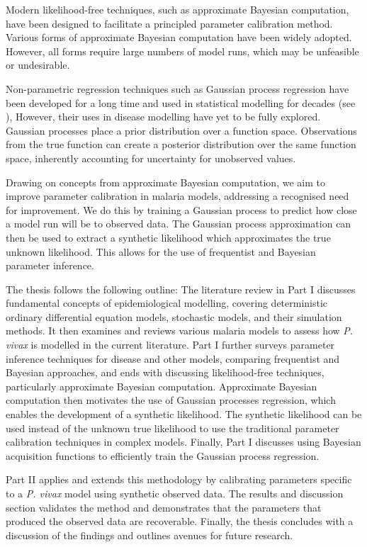 Modern
likelihood-free techniques, such as approximate Bayesian computation, 
have been designed to
facilitate a principled parameter calibration method.
Various forms of approximate Bayesian computation have been widely adopted. 
However, all forms 
require large numbers of model runs, which may be unfeasible or undesirable.

Non-parametric regression techniques such as Gaussian process regression
have been developed for a long time and used in statistical 
modelling for decades (see \cite{diggle_analysis_1994}), However,
their uses in disease modelling
have yet to be fully explored. Gaussian processes place a prior 
distribution over a function space. Observations from the true function can
create a posterior distribution over the same function space, 
inherently accounting for uncertainty for unobserved values.

Drawing on concepts from approximate Bayesian computation, we aim to improve
parameter calibration in malaria models, addressing a recognised need for
improvement. We do this by training a Gaussian process to predict how close a
model run will be to observed data. The Gaussian process approximation
can then be used to extract a synthetic likelihood which approximates the
true unknown likelihood. This allows for the use of frequentist and Bayesian
parameter inference.

The thesis follows the following outline: The literature review in Part I
discusses fundamental concepts of epidemiological modelling, covering
deterministic ordinary differential equation models, stochastic models, and
their simulation methods. It then examines and reviews various malaria
models to assess how \textit{P. vivax} is modelled in the
current literature. 
Part I further surveys parameter inference techniques for disease and other
models, comparing
frequentist and Bayesian approaches, and ends with discussing likelihood-free
techniques, particularly approximate Bayesian computation.
Approximate Bayesian computation then motivates the use of Gaussian processes 
regression, which enables the development of a synthetic likelihood. 
The synthetic likelihood can be used instead of the unknown true
likelihood to use the traditional parameter calibration techniques in complex
models. Finally, Part I discusses using Bayesian acquisition functions to 
efficiently train
the Gaussian process regression.

Part II applies and extends this methodology by calibrating parameters specific
to a \textit{P. vivax} model using synthetic observed data. The results and 
discussion
section validates the method and demonstrates that the parameters that produced
the observed data are recoverable. Finally, the thesis concludes with a
discussion of the findings and outlines avenues for future research.